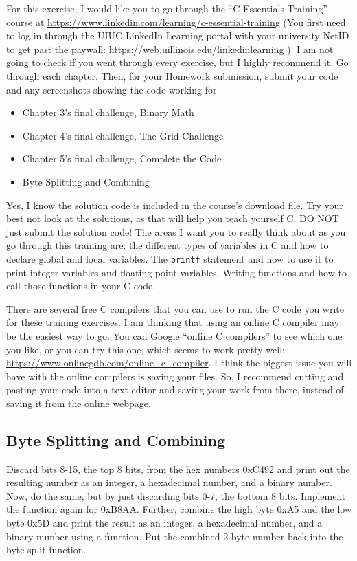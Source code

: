 \documentclass[11pt]{article}
\begin{document}
%
\MakeAssignmentTitle


For this exercise, I would like you to go through the “C Essentials Training” course at \url{https://www.linkedin.com/learning/c-essential-training} (You first need to log in through the UIUC LinkedIn Learning portal with your university NetID to get past the paywall: \url{https://web.uillinois.edu/linkedinlearning} ). I am not going to check if you went through every exercise, but I highly recommend it. Go through each chapter. Then, for your Homework submission, submit your code and any screenshots showing the code working for
\begin{itemize}
    \item Chapter 3’s final challenge, Binary Math
    \item Chapter 4’s final challenge, The Grid Challenge
    \item Chapter 5’s final challenge, Complete the Code
    \item Byte Splitting and Combining
\end{itemize}
%
Yes, I know the solution code is included in the course’s download file. Try your best not look at the solutions, as that will help you teach yourself C. DO NOT just submit the solution code! The areas I want you to really think about as you go through this training are: the different types of variables in C and how to declare global and local variables. The \texttt{printf} statement and how to use it to print integer variables and floating point variables. Writing functions and how to call those functions in your C code.
\par
There are several free C compilers that you can use to run the C code you write for these training exercises. I am thinking that using an online C compiler may be the easiest way to go. You can Google “online C compilers” to see which one you like, or you can try this one, which seems to work pretty well: \url{https://www.onlinegdb.com/online_c_compiler}. I think the biggest issue you will have with the online compilers is saving your files. So, I recommend cutting and pasting your code into a text editor and saving your work from there, instead of saving it from the online webpage.

\subsection*{Byte Splitting and Combining}
Discard bits 8-15, the top 8 bits, from the hex numbers 0xC492 and print out the resulting number as an integer, a hexadecimal number, and a binary number. Now, do the same, but by just discarding bits 0-7, the bottom 8 bits. Implement the function again for 0xB8AA. Further, combine the high byte 0xA5 and the low byte 0x5D and print the result as an integer, a hexadecimal number, and a binary number using a function. Put the combined 2-byte number back into the byte-split function.
\end{document}
